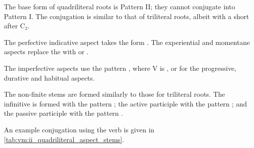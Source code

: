 \documentclass[grammar]{subfiles}
\begin{document}
The base form of quadriliteral roots is Pattern II; they cannot conjugate into
Pattern I.  The conjugation is similar to that of triliteral roots, albeit with
a short  after C₂.

The perfective indicative aspect takes the form . The
experiential and momentane aspects replace the  with  or .

The imperfective aspects use the pattern , where V is
,  or  for the progressive, durative and habitual aspects.

The non-finite stems are formed similarly to those for triliteral roots.  The
infinitive is formed with the pattern ; the active participle
with the pattern ; and the passive participle with the pattern
.

An example conjugation using the verb  is given in
\cref{tab:vm:ii_quadriliteral_aspect_stems}. 

\begin{table}[h!]\small\capstart
  \centering
  \\
  \caption{Pattern II quadriliteral stems\label{tab:vm:ii_quadriliteral_aspect_stems}}
\end{table}
\end{document}

